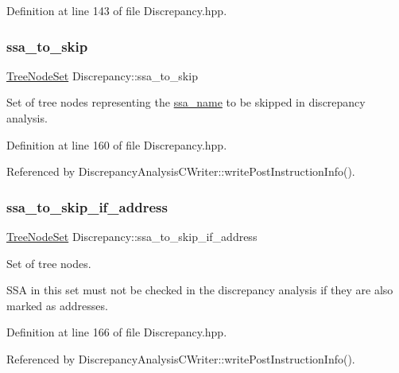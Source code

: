 Definition at line 143 of file Discrepancy.\+hpp.

\mbox{\label{structDiscrepancy_a948b9a53adc3a65cda0046eb6c5e516a}} 
\subsubsection{\texorpdfstring{ssa\+\_\+to\+\_\+skip}{ssa\_to\_skip}}
{\footnotesize\ttfamily \hyperlink{classTreeNodeSet}{Tree\+Node\+Set} Discrepancy\+::ssa\+\_\+to\+\_\+skip}



Set of tree nodes representing the \hyperlink{structssa__name}{ssa\+\_\+name} to be skipped in discrepancy analysis. 



Definition at line 160 of file Discrepancy.\+hpp.



Referenced by Discrepancy\+Analysis\+C\+Writer\+::write\+Post\+Instruction\+Info().

\mbox{\label{structDiscrepancy_a9c2015c8e6d41e5ff0ec2b713527f132}} 
\subsubsection{\texorpdfstring{ssa\+\_\+to\+\_\+skip\+\_\+if\+\_\+address}{ssa\_to\_skip\_if\_address}}
{\footnotesize\ttfamily \hyperlink{classTreeNodeSet}{Tree\+Node\+Set} Discrepancy\+::ssa\+\_\+to\+\_\+skip\+\_\+if\+\_\+address}



Set of tree nodes. 

S\+SA in this set must not be checked in the discrepancy analysis if they are also marked as addresses. 

Definition at line 166 of file Discrepancy.\+hpp.



Referenced by Discrepancy\+Analysis\+C\+Writer\+::write\+Post\+Instruction\+Info().

\mbox{\label{structDiscrepancy_a72a1643010c0f91d5925ca916cc1782e}} 
